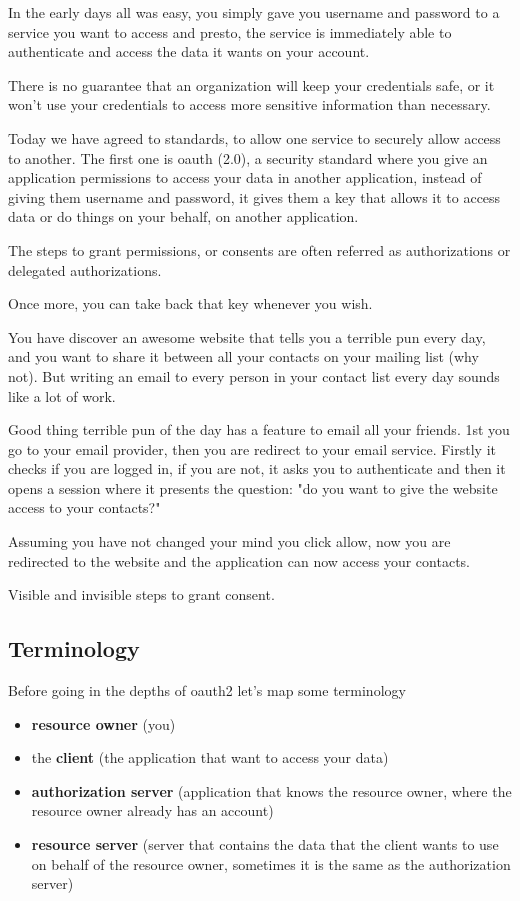 \documentclass[20pt]{style}
\begin{document}
In the early days all was easy, you simply gave you username and password to a
service you want to access and presto, the service is immediately able to
authenticate and access the data it wants on your account.

There is no guarantee that an organization will keep your credentials safe, or
it won't use your credentials to access more sensitive information than
necessary.

Today we have agreed to standards, to allow one service to securely allow access
to another.
The first one is oauth (2.0), a security standard where you give an application
permissions to access your data in another application, instead of giving them
username and password, it gives them a key that allows it to access data or do
things on your behalf, on another application.

The steps to grant permissions, or consents are often referred as authorizations
or delegated authorizations.

Once more, you can take back that key whenever you wish.

You have discover an awesome website that tells you a terrible pun every day,
and you want to share it between all your contacts on your mailing list (why
not).
But writing an email to every person in your contact list every day sounds like
a lot of work.

Good thing terrible pun of the day has a feature to email all your friends.
1st you go to your email provider, then you are redirect to your email service.
Firstly it checks if you are logged in, if you are not, it asks you to
authenticate and then it opens a session where it presents the question: "do you
want to give the website access to your contacts?"

Assuming you have not changed your mind you click allow, now you are redirected
to the website and the application can now access your contacts.

Visible and invisible steps to grant consent.
\subsection{Terminology}
Before going in the depths of oauth2 let's map some terminology
\begin{itemize}
    \item \textbf{resource owner} (you)
    \item the \textbf{client} (the application that want to access your data)
    \item \textbf{authorization server} (application that knows the resource owner, where
        the resource owner already has an account)
    \item \textbf{resource server} (server that contains the data that the client wants
        to use on behalf of the resource owner, sometimes it is the same as the
        authorization server)
\end{itemize}
\end{document}

